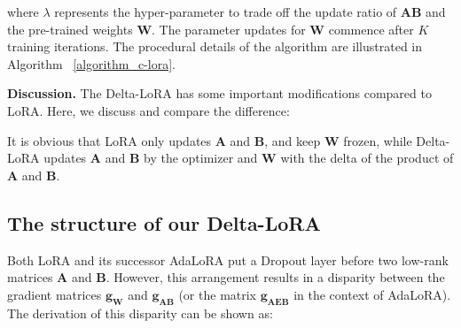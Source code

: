 {where $\lambda$ represents the hyper-parameter to trade off the update ratio of $\boldsymbol{A}\boldsymbol{B}$ and the pre-trained weights $\boldsymbol{W}$. The parameter updates for $\boldsymbol{W}$ commence after $K$ training iterations. The procedural details of the algorithm are illustrated in Algorithm ~\ref{algorithm_c-lora}.

\textbf{Discussion.} The Delta-LoRA has some important modifications compared to LoRA. Here, we discuss and compare the difference:


It is obvious that LoRA only updates $\boldsymbol{A}$ and $\boldsymbol{B}$, and keep $\boldsymbol{W}$ frozen, while Delta-LoRA updates $\boldsymbol{A}$ and $\boldsymbol{B}$ by the optimizer and $\boldsymbol{W}$ with the delta of the product of $\boldsymbol{A}$ and $\boldsymbol{B}$. 

\subsection{The structure of our Delta-LoRA} Both LoRA and its successor AdaLoRA put a Dropout layer before two low-rank matrices $\boldsymbol{A}$ and $\boldsymbol{B}$. However, this arrangement results in a disparity between the gradient matrices $\boldsymbol{g}_{\boldsymbol{W}}$ and $\boldsymbol{g}_{\boldsymbol{A}\boldsymbol{B}}$ (or the matrix $\boldsymbol{g}_{\boldsymbol{A}\boldsymbol{E}\boldsymbol{B}}$ in the context of AdaLoRA).  The derivation of this disparity can be shown as:

}
